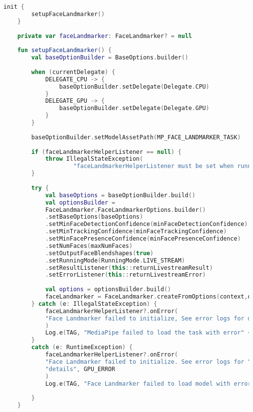 \begin{lstlisting}[language=Kotlin, caption=init() en setupFaceLandmarker() in FaceLandmarkerHelper.kt, label={lst:setupFaceLandmarker}]
    init {
        setupFaceLandmarker()
    }
    
    private var faceLandmarker: FaceLandmarker? = null
    
    fun setupFaceLandmarker() {
        val baseOptionBuilder = BaseOptions.builder()
        
        when (currentDelegate) {
            DELEGATE_CPU -> {
                baseOptionBuilder.setDelegate(Delegate.CPU)
            }
            DELEGATE_GPU -> {
                baseOptionBuilder.setDelegate(Delegate.GPU)
            }
        }
        
        baseOptionBuilder.setModelAssetPath(MP_FACE_LANDMARKER_TASK)
        
        if (faceLandmarkerHelperListener == null) {
            throw IllegalStateException(
                    "faceLandmarkerHelperListener must be set when runningMode is LIVE_STREAM")
        }
        
        try {
            val baseOptions = baseOptionBuilder.build()
            val optionsBuilder =
            FaceLandmarker.FaceLandmarkerOptions.builder()
            .setBaseOptions(baseOptions)
            .setMinFaceDetectionConfidence(minFaceDetectionConfidence)
            .setMinTrackingConfidence(minFaceTrackingConfidence)
            .setMinFacePresenceConfidence(minFacePresenceConfidence)
            .setNumFaces(maxNumFaces)
            .setOutputFaceBlendshapes(true)
            .setRunningMode(RunningMode.LIVE_STREAM)
            .setResultListener(this::returnLivestreamResult)
            .setErrorListener(this::returnLivestreamError)
            
            val options = optionsBuilder.build()
            faceLandmarker = FaceLandmarker.createFromOptions(context,options)
        } catch (e: IllegalStateException) {
            faceLandmarkerHelperListener?.onError(
            "Face Landmarker failed to initialize, See error logs for details"
            )
            Log.e(TAG, "MediaPipe failed to load the task with error" + e.message)
        }
        catch (e: RuntimeException) {
            faceLandmarkerHelperListener?.onError(
            "Face Landmarker failed to initialize. See error logs for " +
            "details", GPU_ERROR
            )
            Log.e(TAG, "Face Landmarker failed to load model with error: " + 
                                                                        e.message)
        }
    }
\end{lstlisting}

